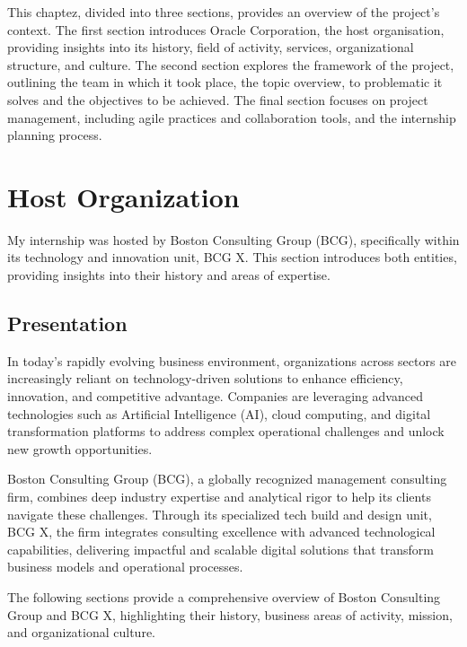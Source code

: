 This chaptez, divided into three sections, provides an overview of the project’s context. The first section introduces Oracle Corporation, the host organisation, providing insights into its history, field of activity, services, organizational structure, and culture. The second section explores the framework of the project, outlining the team in which it took place, the topic overview, to problematic it solves and the objectives to be achieved. The final section focuses on project management, including agile practices and collaboration tools, and the internship planning process.
\newpage
{}

\section{Host Organization}

My internship was hosted by Boston Consulting Group (BCG), specifically within its technology and innovation unit, BCG X. This section introduces both entities, providing insights into their history and areas of expertise.

\subsection{Presentation}
In today's rapidly evolving business environment, organizations across sectors are increasingly reliant on technology-driven solutions to enhance efficiency, innovation, and competitive advantage. Companies are leveraging advanced technologies such as Artificial Intelligence (AI), cloud computing, and digital transformation platforms to address complex operational challenges and unlock new growth opportunities.\mynewline

Boston Consulting Group (BCG), a globally recognized management consulting firm, combines deep industry expertise and analytical rigor to help its clients navigate these challenges. Through its specialized tech build and design unit, BCG X, the firm integrates consulting excellence with advanced technological capabilities, delivering impactful and scalable digital solutions that transform business models and operational processes.\mynewline

The following sections provide a comprehensive overview of Boston Consulting Group and BCG X, highlighting their history, business areas of activity, mission, and organizational culture.

